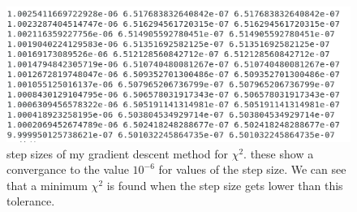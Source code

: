 \documentclass[12pt]{article}
\begin{document}
\begin{figure}
    \centering
    \includegraphics[width=14cm]{HW2_schecterfit_convergenceOfChi.png}
    \caption{step sizes of my gradient descent method for $\chi^2$. these show a convergance to the value $10^{-6}$ for values of the step size. We can see that a minimum $\chi^2$ is found when the step size gets lower than this tolerance.}
    \label{fig:my_label}
\end{figure}{}
\end{document}
